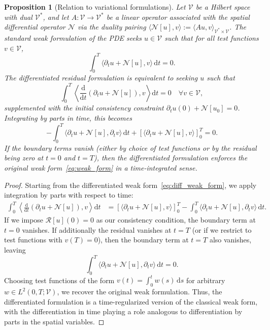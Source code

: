 \documentclass[11pt,reqno]{amsart}
\theoremstyle{plain}
\newtheorem{proposition}[theorem]{Proposition}
\theoremstyle{definition}
\theoremstyle{remark}
\begin{document}
\begin{proposition}[Relation to variational formulations]\label{prop:variational_connection}
Let $\mathcal{V}$ be a Hilbert space with dual $\mathcal{V}^*$, and let $A: \mathcal{V} \to \mathcal{V}^*$ be a linear operator associated with the spatial differential operator $\mathcal{N}$ via the duality pairing $\langle \mathcal{N}[u], v \rangle := \langle A u, v \rangle_{\mathcal{V}^* \times \mathcal{V}}$. The standard weak formulation of the PDE seeks $u \in \mathcal{V}$ such that for all test functions $v \in \mathcal{V}$,
\begin{equation}\label{eq:weak_form}
    \int_0^T \langle \partial_t u + \mathcal{N}[u], v \rangle \, \mathrm{d}t = 0.
\end{equation}
The differentiated residual formulation is equivalent to seeking $u$ such that
\begin{equation}\label{eq:diff_weak_form}
    \int_0^T \left\langle \frac{\mathrm{d}}{\mathrm{d}t}(\partial_t u + \mathcal{N}[u]), v \right\rangle \mathrm{d}t = 0 \quad \forall v \in \mathcal{V},
\end{equation}
supplemented with the initial consistency constraint $\partial_t u(0) + \mathcal{N}[u_0] = 0$. Integrating by parts in time, this becomes
\begin{equation}
    -\int_0^T \langle \partial_t u + \mathcal{N}[u], \partial_t v \rangle \, \mathrm{d}t + \left[ \langle \partial_t u + \mathcal{N}[u], v \rangle \right]_0^T = 0.
\end{equation}
If the boundary terms vanish (either by choice of test functions or by the residual being zero at $t=0$ and $t=T$), then the differentiated formulation enforces the original weak form~\eqref{eq:weak_form} in a time-integrated sense.
\end{proposition}

\begin{proof}
Starting from the differentiated weak form~\eqref{eq:diff_weak_form}, we apply integration by parts with respect to time:
\begin{align*}
\int_0^T \left\langle \frac{\mathrm{d}}{\mathrm{d}t}(\partial_t u + \mathcal{N}[u]), v \right\rangle \mathrm{d}t 
&= \left[ \langle \partial_t u + \mathcal{N}[u], v \rangle \right]_0^T - \int_0^T \langle \partial_t u + \mathcal{N}[u], \partial_t v \rangle \, \mathrm{d}t.
\end{align*}
If we impose $\mathcal{R}[u](0) = 0$ as our consistency condition, the boundary term at $t=0$ vanishes. If additionally the residual vanishes at $t=T$ (or if we restrict to test functions with $v(T) = 0$), then the boundary term at $t=T$ also vanishes, leaving
\[
\int_0^T \langle \partial_t u + \mathcal{N}[u], \partial_t v \rangle \, \mathrm{d}t = 0.
\]
Choosing test functions of the form $v(t) = \int_0^t w(s) \, \mathrm{d}s$ for arbitrary $w \in L^2(0,T; \mathcal{V})$, we recover the original weak formulation. Thus, the differentiated formulation is a time-regularized version of the classical weak form, with the differentiation in time playing a role analogous to differentiation by parts in the spatial variables.
\end{proof}
\end{document}
